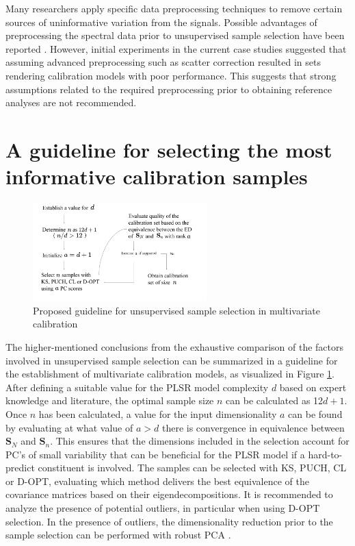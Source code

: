 \documentclass[preprint,12pt]{elsarticle}
\begin{document}
Many researchers apply specific data preprocessing techniques to remove certain sources of uninformative variation from the signals. Possible advantages of preprocessing the spectral data prior to unsupervised sample selection have been reported \cite{Liu2019}.
However, initial experiments in the current case studies suggested that assuming advanced preprocessing such as scatter correction resulted in sets rendering calibration models with poor performance. This suggests that strong assumptions related to the required preprocessing prior to obtaining reference analyses are not recommended.


\section{A guideline for selecting the most informative calibration samples}\label{scheme}


\begin{figure}[H]
\includegraphics[width=0.6\textwidth]{manuscript/figures/scheme.png}
\centering
\caption{Proposed guideline for unsupervised sample selection in multivariate calibration}
\label{fig_scheme}
\end{figure}

The higher-mentioned conclusions from the exhaustive comparison of the factors involved in unsupervised sample selection can be summarized in a guideline for the establishment of multivariate calibration models, as visualized in Figure \ref{fig_scheme}. After defining a suitable value for the PLSR model complexity $d$ based on expert knowledge and literature, the optimal sample size $n$ can be calculated as 12$d+1$. Once $n$ has been calculated, a value for the input dimensionality $a$ can be found by evaluating at what value of $a>d$ there is convergence in equivalence between $\mathbf{S}_N$ and $\mathbf{S}_n$. This ensures that the dimensions included in the selection account for PC's of small variability that can be beneficial for the PLSR model if a hard-to-predict constituent is involved. The samples can be selected with KS, PUCH, CL or D-OPT, evaluating which method delivers the best equivalence of the covariance matrices based on their eigendecompositions. It is recommended to analyze the presence of potential outliers, in particular when using D-OPT selection. In the presence of outliers, the dimensionality reduction prior to the sample selection can be performed with robust PCA \cite{Hubert2005}.
\end{document}
